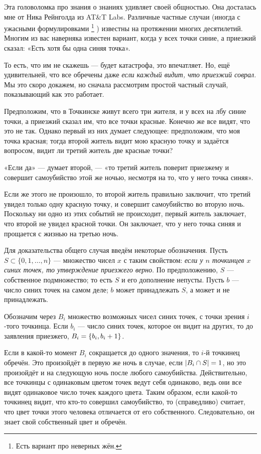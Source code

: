 Эта головоломка про знания о знаниях удивляет своей общностью.
Она досталась мне от Ника Рейнголда из AT\&T Labs.
Различные частные случаи (иногда с ужасными формулировками%
\footnote{Есть вариант про неверных жён\pr.}%
) известны на протяжении многих десятилетий.
Многим из вас наверняка известен вариант, когда у всех точки синие, а приезжий сказал: «Есть хотя бы одна синяя точка».

То есть, что им не скажешь --- будет катастрофа, 
это впечатляет.
Но, ещё удивительней, что все обречены даже \emph{если каждый видит, что приезжий соврал}. 
Мы это скоро докажем, но сначала рассмотрим простой частный случай, показывающий как это работает.

Предположим, что в Точкинске живут всего три жителя, и у всех на лбу синие точки,
а приезжий сказал им, что все точки красные.
Конечно же все видят, что это не так.
Однако первый из них думает следующее: предположим, что моя точка красная; тогда второй житель видит мою красную точку и задаётся вопросом, видит ли третий житель две красные точки?

«Если да» --- думает второй, --- «то третий житель поверит приезжему и совершит самоубийство этой же ночью, несмотря на то, что у него точка синяя».

Если же этого не произошло, то второй житель правильно заключит, что третий увидел только одну красную точку, и совершит самоубийство во вторую ночь.
Поскольку ни одно из этих событий не происходит, первый житель заключает, что второй не увидел красной точки.
Он заключает, что у него точка синяя и прощается с жизнью на третью ночь.

Для доказательства общего случая введём некоторые обозначения.
Пусть $S\subset\{0,1,\dots,n\}$ --- множество чисел $x$ с таким свойством: \emph{если у $n$ точкинцев $x$ синих точек, то утверждение приезжего верно}.
По предположению, $S$ --- собственное подмножество; то есть $S$ и его дополнение непусты.
Пусть $b$ --- число синих точек на самом деле;
$b$ может принадлежать $S$, а может и не принадлежать.

Обозначим через $B_i$ множество возможных чисел синих точек, с точки зрения $i$-того точкинца.
Если $b_i$ --- число синих точек, которое он видит на других, то до заявления приезжего, $B_i=\{b_i,b_i\z+1\}$.

Если в какой-то момент $B_i$ сокращается до одного значения, то $i$-й точкинец обречён.
Это произойдёт в первую же ночь в случае, если  $|B_i\z\cap S|=1$, но это произойдёт и на следующую ночь после любого самоубийства.
Действительно, все точкинцы с одинаковым цветом точек ведут себя одинаково, ведь они все видят одинаковое число точек каждого цвета.
Таким образом, если какой-то точкинец видит, что кто-то совершил самоубийство, то (справедливо) считает, что цвет точки этого человека отличается от его собственного. 
Следовательно, он знает свой собственный цвет и обречён.

